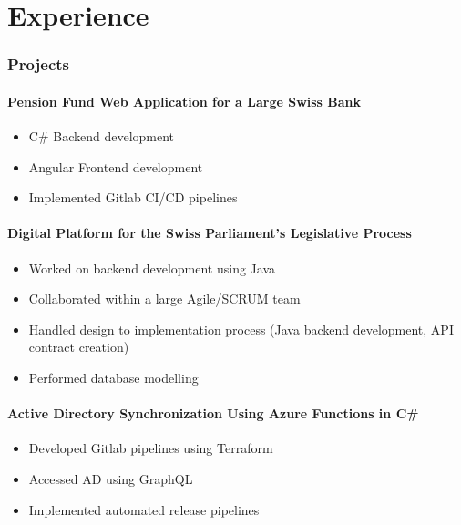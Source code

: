 \section{Experience}
\vspace{-1em}
\subsubsection*{Projects}
\paragraph{Pension Fund Web Application for a Large Swiss Bank}
\begin{itemize}
    \item C\# Backend development
    \item Angular Frontend development
    \item Implemented Gitlab CI/CD pipelines
\end{itemize}

\paragraph{Digital Platform for the Swiss Parliament's Legislative Process}
\begin{itemize}
    \item Worked on backend development using Java
    \item Collaborated within a large Agile/SCRUM team
    \item Handled design to implementation process (Java backend development, API contract creation)
    \item Performed database modelling
\end{itemize}

\paragraph{Active Directory Synchronization Using Azure Functions in C\#}
\begin{itemize}
    \item Developed Gitlab pipelines using Terraform
    \item Accessed AD using GraphQL
    \item Implemented automated release pipelines
\end{itemize}
